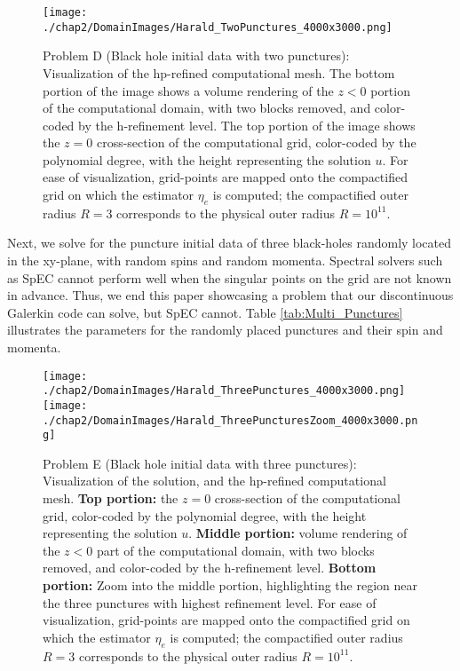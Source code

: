 \begin{figure}[ht!]
  \centering
\texttt{[image: ./chap2/DomainImages/Harald\_TwoPunctures\_4000x3000.png]}
  \caption{Problem D (Black hole initial data with two punctures):
    Visualization of the hp-refined computational mesh.  The bottom
    portion of the image shows a volume rendering of the $z<0$ portion
    of the computational domain, with two blocks removed, and
    color-coded by the h-refinement level.  The top portion of the
    image shows the $z=0$ cross-section of the computational grid, color-coded by the polynomial degree, with the height representing the solution $u$. For ease of visualization, grid-points are mapped onto the compactified grid on which the estimator $\eta_e$ is computed; the compactified outer radius $R=3$ corresponds to the physical outer radius $R=10^{11}$.}
  \label{fig:Two_Punctures_Mesh_Final}
\end{figure}
%
Next, we solve for the puncture initial data of three black-holes
randomly located in the xy-plane, with random spins and random
momenta. Spectral solvers such as SpEC cannot perform well when the
singular points on the grid are not known in advance. Thus, we end
this paper showcasing a problem that our discontinuous Galerkin code
can solve, but SpEC cannot. Table \ref{tab:Multi_Punctures}
illustrates the parameters for the randomly placed punctures and their
spin and momenta.
%
\begin{figure}[htbp!]
  \centering
  \texttt{[image: ./chap2/DomainImages/Harald\_ThreePunctures\_4000x3000.png]}
  \\
\texttt{[image: ./chap2/DomainImages/Harald\_ThreePuncturesZoom\_4000x3000.png]}

  \caption{Problem E (Black hole initial data with three punctures):
    Visualization of the solution, and the hp-refined computational
    mesh.  {\bf Top portion:} the $z=0$ cross-section of the
    computational grid, color-coded by the polynomial degree, with the
    height representing the solution $u$.  {\bf Middle portion:}
    volume rendering of the $z<0$ part of the computational domain,
    with two blocks removed, and color-coded by the
    h-refinement level.  {\bf Bottom portion:} Zoom into the middle
    portion, highlighting the region near the three punctures with
    highest refinement level. For ease of visualization, grid-points are mapped onto the compactified grid on which the estimator $\eta_e$ is computed; the compactified outer radius $R=3$ corresponds to the physical outer radius $R=10^{11}$. }
  \label{fig:Two_Punctures_Mesh_Final}
\end{figure}

